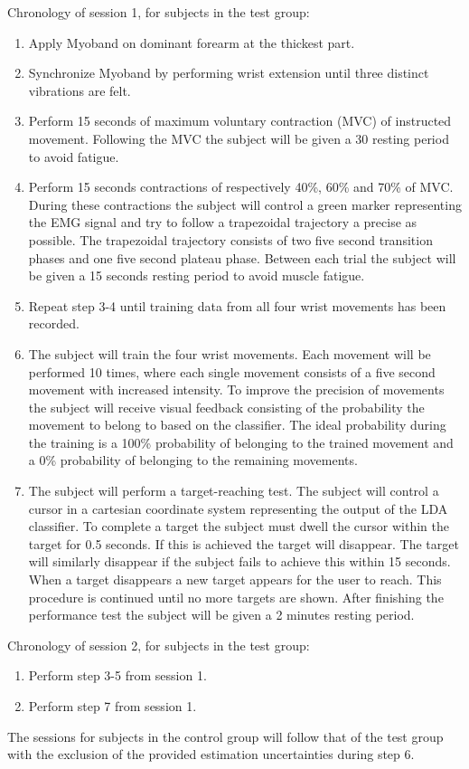 Chronology of session 1, for subjects in the test group:
\begin{enumerate}
	\item Apply Myoband on dominant forearm at the thickest part.
	\item Synchronize Myoband by performing wrist extension until three distinct vibrations are felt.
	\item Perform 15 seconds of maximum voluntary contraction (MVC) of instructed movement. Following the MVC the subject will be given a 30 resting period to avoid fatigue.
	\item Perform 15 seconds contractions of respectively 40\%, 60\% and 70\% of MVC. During these contractions the subject will control a green marker representing the EMG signal and try to follow a trapezoidal trajectory a precise as possible. The trapezoidal trajectory consists of two five second transition phases and one five second plateau phase. Between each trial the subject will be given a 15 seconds resting period to avoid muscle fatigue.
	\item Repeat step 3-4 until training data from all four wrist movements has been recorded.
	\item The subject will train the four wrist movements. Each movement will be performed 10 times, where each single movement consists of a five second movement with increased intensity. To improve the precision of movements the subject will receive visual feedback consisting of the probability the movement to belong to based on the classifier. The ideal probability during the training is a 100\% probability of belonging to the trained movement and a 0\% probability of belonging to the remaining movements. 
	\item The subject will perform a target-reaching test. The subject will control a cursor in a cartesian coordinate system representing the output of the LDA classifier. To complete a target the subject must dwell the cursor within the target for 0.5 seconds. If this is achieved the target will disappear. The target will similarly disappear if the subject fails to achieve this within 15 seconds. When a target disappears a new target appears for the user to reach. This procedure is continued until no more targets are shown. After finishing the performance test the subject will be given a 2 minutes resting period.
\end{enumerate}


Chronology of session 2, for subjects in the test group:
\begin{enumerate}
	\item Perform step 3-5 from session 1.
	\item Perform step 7 from session 1. 
\end{enumerate}

The sessions for subjects in the control group will follow that of the test group with the exclusion of the provided estimation uncertainties during step 6.

\clearpage








